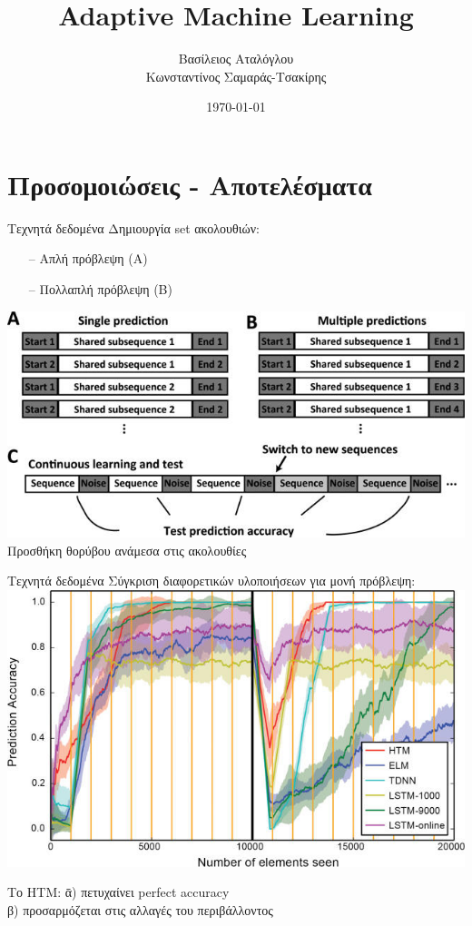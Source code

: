 \documentclass[11pt,center]{beamer}
\title{\huge{Adaptive Machine Learning}}
\author{Βασίλειος Αταλόγλου \\ Κωνσταντίνος Σαμαράς-Τσακίρης}
\date{\today}
\begin{document}
  \begin{frame}%
	  \titlepage
  \end{frame}

\section{Προσομοιώσεις - Αποτελέσματα}

	\begin{frame}{Τεχνητά δεδομένα}
		Δημιουργία set ακολουθιών:
		\begin{itemize}
			\item[--]Απλή πρόβλεψη (A)
			\item[--]Πολλαπλή πρόβλεψη (B)
		\end{itemize}
		\vfill
		\includegraphics[width=0.6 \textwidth,center]{../pics/sequences.jpg}
		\vfill
		\pause
		Προσθήκη θορύβου ανάμεσα στις ακολουθίες
	\end{frame}
	
	
	
	\begin{frame}{Τεχνητά δεδομένα}
		Σύγκριση διαφορετικών υλοποιήσεων για μονή πρόβλεψη:\\
		\vspace{1em}
		\includegraphics[width=0.7 \textwidth,center]{../pics/single_prediction.jpg}
		\pause
		\begin{tabbing}
  			Το HTM:  \=α) πετυχαίνει perfect accuracy\\
  			\>β) προσαρμόζεται στις αλλαγές του περιβάλλοντος\\
  		\end{tabbing}
	\end{frame}
	
\end{document}
